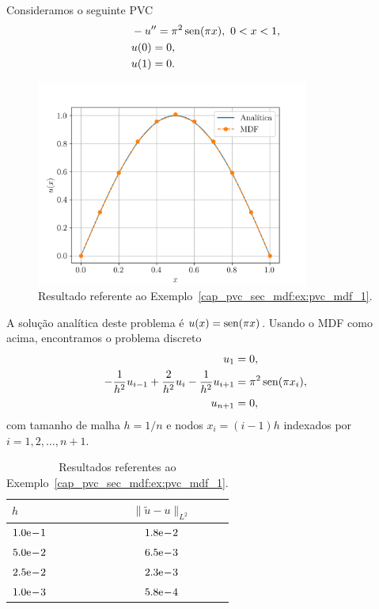 \begin{ex}\label{cap_pvc_sec_mdf:ex:pvc_mdf_1}
  Consideramos o seguinte PVC
  \begin{align}
    &-u'' = \pi^2\operatorname{sen}(\pi x), ~0 < x < 1,\\
    &u(0) = 0,\\
    &u(1) = 0.
  \end{align}

\begin{figure}[h!]
  \centering
  \includegraphics[width=0.8\textwidth]{./cap_pvc/dados/fig_mdf/fig}
  \caption{Resultado referente ao Exemplo~\ref{cap_pvc_sec_mdf:ex:pvc_mdf_1}.}
  \label{cap_pvc_sec_mdf:fig:ex_pvc_mdf_1}
\end{figure}

A solução analítica deste problema é $u(x) = \operatorname{sen}(\pi x)$. Usando o MDF como acima, encontramos o problema discreto
\begin{subequations}
  \begin{align}
    u_1 &= 0,\\
    -\frac{1}{h^2}u_{i-1} + \frac{2}{h^2}u_i - \frac{1}{h^2}u_{i+1} &= \pi^2\operatorname{sen}(\pi x_i),\\
    u_{n+1} &= 0,
  \end{align}
\end{subequations}
com tamanho de malha $h=1/n$ e nodos $x_i = (i-1)h$ indexados por $i = 1, 2, \dotsc, n+1$.

\begin{table}[h!]
  \centering
  \caption{Resultados referentes ao Exemplo~\ref{cap_pvc_sec_mdf:ex:pvc_mdf_1}.}
  \begin{tabular}{l|c}\toprule
    $h$ & $\|\tilde{u} - u\|_{L^2}$ \\\midrule
    $1.0\mathrm{e}\!-\!1$ & $1.8\mathrm{e}\!-\!2$\\
    $5.0\mathrm{e}\!-\!2$ & $6.5\mathrm{e}\!-\!3$\\
    $2.5\mathrm{e}\!-\!2$ & $2.3\mathrm{e}\!-\!3$\\
    $1.0\mathrm{e}\!-\!3$ & $5.8\mathrm{e}\!-\!4$\\\bottomrule
  \end{tabular}
  \label{cap_pvc_sec_mdf:tab:ex_pvc_mdf_1}
\end{table}


\end{ex}
